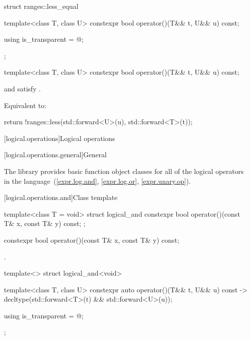 %
\begin{itemdecl}
struct ranges::less_equal {
  template<class T, class U>
    constexpr bool operator()(T&& t, U&& u) const;

  using is_transparent = @\unspecnc@;
};
\end{itemdecl}

\begin{itemdecl}
template<class T, class U>
  constexpr bool operator()(T&& t, U&& u) const;
\end{itemdecl}

\begin{itemdescr}
\pnum
\constraints
{} and  satisfy .

\pnum
\effects
Equivalent to:
\begin{codeblock}
return !ranges::less{}(std::forward<U>(u), std::forward<T>(t));
\end{codeblock}
\end{itemdescr}

[logical.operations]{Logical operations}

[logical.operations.general]{General}

\pnum
The library provides basic function object classes for all of the logical
operators in the language~(\ref{expr.log.and}, \ref{expr.log.or}, \ref{expr.unary.op}).

[logical.operations.and]{Class template }

%
\begin{itemdecl}
template<class T = void> struct logical_and {
  constexpr bool operator()(const T& x, const T& y) const;
};
\end{itemdecl}

%
\begin{itemdecl}
constexpr bool operator()(const T& x, const T& y) const;
\end{itemdecl}

\begin{itemdescr}
\pnum
\returns
{}.
\end{itemdescr}

%
\begin{itemdecl}
template<> struct logical_and<void> {
  template<class T, class U> constexpr auto operator()(T&& t, U&& u) const
    -> decltype(std::forward<T>(t) && std::forward<U>(u));

  using is_transparent = @\unspec@;
};
\end{itemdecl}


